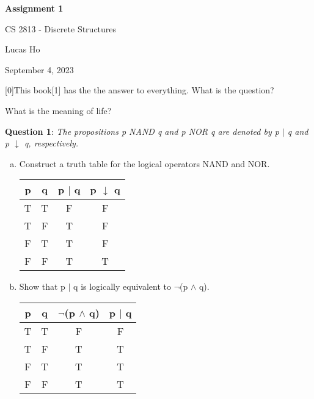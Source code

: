 \documentclass{article} %
\newcommand{\question}[2][]{\begin{flushleft}
        \textbf{Question #1}: \textit{#2}

\end{flushleft}}
\newcommand{\maketitletwo}[2][]{\begin{center}
        \Large{\textbf{Assignment 1}
            
            CS 2813 - Discrete Structures} %
        \vspace{5pt}
        
        \normalsize{Lucas Ho  %
        
        September 4, 2023}        %
        \vspace{15pt}
        
\end{center}}
\begin{document}
    \maketitletwo[5]  %
    
    \question[0]{This book[1] has the the answer to everything. What is the question?} 

    What is the meaning of life?
    
    \question[1]{The propositions p NAND q and p NOR q are denoted by p $\mid$ q and p $\downarrow$ q, respectively.}
    
    \begin{enumerate}[a.]
        \item {Construct a truth table for the logical operators NAND and NOR.}
        
        \begin{center}
            \begin{tabular}{|c|c|c|c|}
                \hline
                p & q & p $\mid$ q & p $\downarrow$ q \\
                \hline
                T & T & F & F \\
                T & F & T & F \\
                F & T & T & F \\
                F & F & T & T \\
                \hline
            \end{tabular}

        \end{center}

        \item {Show that p $\mid$ q is logically equivalent to $\neg$(p $\land$ q).}
        
        \begin{center}
            \begin{tabular}{|c|c|c|c|}
                \hline
                p & q & $\neg$(p $\land$ q) & p $\mid$ q \\
                \hline
                T & T & F & F \\
                T & F & T & T \\
                F & T & T & T \\
                F & F & T & T \\
                \hline
            \end{tabular}

        \end{center}
    \end{enumerate}
    
\end{document}
